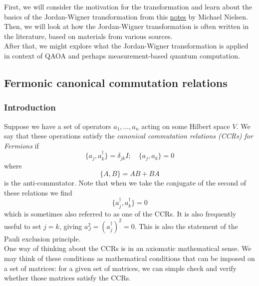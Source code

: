 \documentclass{book}
\theoremstyle{definition}
\begin{document}
First, we will consider the motivation for the transformation and learn about the basics of the Jordan-Wigner transformation from this \href{http://michaelnielsen.org/blog/archive/notes/fermions_and_jordan_wigner.pdf}{\underline{notes}} by Michael Nielsen. \\

Then, we will look at how the Jordan-Wigner transformation is often written in the literature, based on materials from various sources. \\

After that, we might explore what the Jordan-Wigner transformation is applied in context of QAOA and perhaps measurement-based quantum computation.


\subsection{Fermonic canonical commutation relations}

\subsubsection{Introduction}

Suppose we have a set of operators $a_1,\dots,a_n$ acting on some Hilbert space $V$. We say that these operations satisfy the \textit{canonical commutation relations (CCRs) for Fermions} if
\begin{equation}
\boxed{\{ a_j , a_k^\dagger \} = \delta_{jk} I; \quad \{ a_j ,a_k \} = 0}
\end{equation} 
where
\begin{equation}
\{ A,B \} = AB + BA
\end{equation}
is the anti-commutator. Note that when we take the conjugate of the second of these relations we find 
\begin{equation}
\{ a_j^\dagger, a_k^\dagger \} = 0
\end{equation}
which is sometimes also referred to as one of the CCRs. It is also frequently useful to set $j=k$, giving $a_J^2 = (a_j^\dagger)^2 =0$. This is also the statement of the Pauli exclusion principle.  \\


One way of thinking about the CCRs is in an axiomatic mathematical sense. We may think of these conditions as mathematical conditions that can be imposed on a set of matrices: for a given set of matrices, we can simple check and verify whether those matrices satisfy the CCRs. \\
\end{document}
